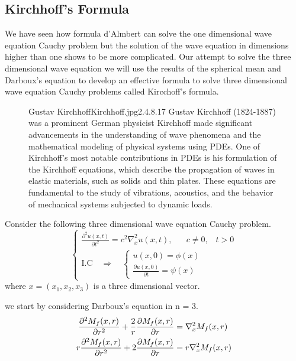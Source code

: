 \documentclass[]{article}
\begin{document}
\subsection{Kirchhoff's Formula}
We have seen how formula d'Almbert can solve the one dimensional wave equation Cauchy problem but the solution of the wave equation in dimensions higher than one shows to be more complicated. 
Our attempt to solve the three dimensional wave equation 
we will use the results of the spherical mean and Darboux's equation to develop an effective formula to solve three dimensional wave equation Cauchy problems called Kircchoff's formula.
\par
\begin{figure}[b]
    \begin{enrichment}{Gustav Kirchhoff}{Kirchhoff.jpg}{2.4}{.8}{.17}
        Gustav Kirchhoff (1824-1887) was a prominent German physicist
        Kirchhoff made significant advancements in the understanding of wave phenomena and the mathematical modeling of physical systems using PDEs.
        One of Kirchhoff's most notable contributions in PDEs is his formulation of the Kirchhoff equations, which describe the propagation of waves in elastic materials, such as solids and thin plates. These equations are fundamental to the study of vibrations, acoustics, and the behavior of mechanical systems subjected to dynamic loads.
    \end{enrichment}    
\end{figure}
Consider the following three dimensional wave equation Cauchy problem.
\begin{equation}
    \begin{cases}
        \displaystyle \frac{\partial^2 u(x,t)}{\partial t^2} = c^2 \nabla_{x}^{2}u(x,t), \;\;\;\;\;\; c\neq 0 ,\;\;\; t > 0
        \\
        \text{I.C} \quad \Longrightarrow \quad 
        \begin{cases}
            u\left(x,0 \right) = \phi\left(x\right)
            \\
            \displaystyle \frac{\partial u\left(x,0 \right)}{\partial t} = \psi\left(x\right)
        \end{cases} 
    \end{cases}
\end{equation}
where $x = (x_1,x_2,x_3)$ is a three dimensional vector.
\par
we start by considering Darboux's equation in n = 3.
\begin{align}
\frac{\partial^2 M_f (x,r)}{\partial r^2} + \frac{2}{r} \frac{\partial M_f (x,r)}{\partial r} &= \nabla_{x}^{2} M_f (x,r) \notag
\\ 
r\frac{\partial^2 M_f (x,r)}{\partial r^2} + 2 \frac{\partial M_f (x,r)}{\partial r} &= r\nabla_{x}^{2} M_f (x,r)
\end{align}
\end{document}
